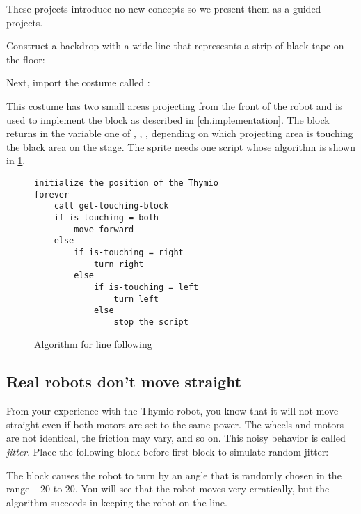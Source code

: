 \label{ch.projects}

These projects introduce no new concepts so we present them as a guided
projects.



Construct a backdrop with a wide line that represesnts a strip of black
tape on the floor:


Next, import the costume called :


This costume has two small areas projecting from the front of the robot
and is used to implement the block  as
described in \cref{ch.implementation}. The block returns in the variable
 one of , , , 
depending on which projecting area is touching the black area on the
stage. The  sprite needs one script whose algorithm is shown
in \cref{fig.line-following}.

\begin{figure}
\begin{footnotesize}
\begin{verbatim}
initialize the position of the Thymio
forever
    call get-touching-block
    if is-touching = both
        move forward
    else
        if is-touching = right
            turn right
        else
            if is-touching = left
                turn left
            else
                stop the script
\end{verbatim}
\end{footnotesize}
\caption{Algorithm for line following}\label{fig.line-following}
\end{figure}

\subsection*{Real robots don't move straight}

From your experience with the Thymio robot, you know that it will not
move straight even if both motors are set to the same power. The wheels
and motors are not identical, the friction may vary, and so on. This
noisy behavior is called \emph{jitter}. Place the following block before
first  block to simulate random jitter:


The block causes the robot to turn by an angle that is randomly chosen
in the range $-20$ to $20$. You will see that the robot moves very
erratically, but the algorithm succeeds in keeping the robot on the line.


